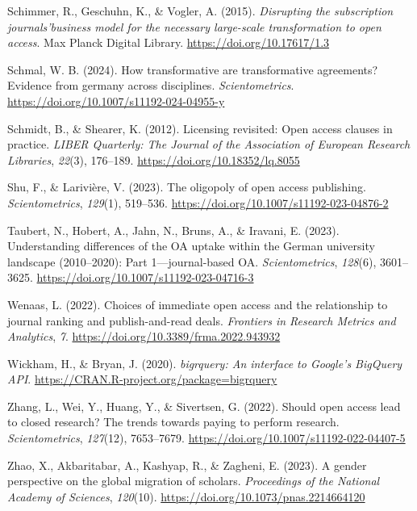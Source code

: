 \documentclass[a4paper,man,floatsintext,longtable,noextraspace,12pt]{apa6}
\newenvironment{CSLReferences}%
  {}%
  {\par}
\begin{document}
\begin{CSLReferences}{1}{0}
\leavevmode{}%
Schimmer, R., Geschuhn, K., \& Vogler, A. (2015). \emph{{Disrupting the
subscription journals'business model for the necessary large-scale
transformation to open access}}. Max Planck Digital Library.
\url{https://doi.org/10.17617/1.3}

\leavevmode{}%
Schmal, W. B. (2024). How transformative are transformative agreements?
Evidence from germany across disciplines. \emph{Scientometrics}.
\url{https://doi.org/10.1007/s11192-024-04955-y}

\leavevmode{}%
Schmidt, B., \& Shearer, K. (2012). Licensing revisited: Open access
clauses in practice. \emph{LIBER Quarterly: The Journal of the
Association of European Research Libraries}, \emph{22}(3), 176--189.
\url{https://doi.org/10.18352/lq.8055}

\leavevmode{}%
Shu, F., \& Larivière, V. (2023). The oligopoly of open access
publishing. \emph{Scientometrics}, \emph{129}(1), 519--536.
\url{https://doi.org/10.1007/s11192-023-04876-2}

\leavevmode{}%
Taubert, N., Hobert, A., Jahn, N., Bruns, A., \& Iravani, E. (2023).
Understanding differences of the OA uptake within the {German}
university landscape (2010--2020): Part 1---journal-based OA.
\emph{Scientometrics}, \emph{128}(6), 3601--3625.
\url{https://doi.org/10.1007/s11192-023-04716-3}

\leavevmode{}%
Wenaas, L. (2022). Choices of immediate open access and the relationship
to journal ranking and publish-and-read deals. \emph{Frontiers in
Research Metrics and Analytics}, \emph{7}.
\url{https://doi.org/10.3389/frma.2022.943932}

\leavevmode{}%
Wickham, H., \& Bryan, J. (2020). \emph{{bigrquery}: An interface to
{Google's BigQuery API}}.
\url{https://CRAN.R-project.org/package=bigrquery}

\leavevmode{}%
Zhang, L., Wei, Y., Huang, Y., \& Sivertsen, G. (2022). Should open
access lead to closed research? The trends towards paying to perform
research. \emph{Scientometrics}, \emph{127}(12), 7653--7679.
\url{https://doi.org/10.1007/s11192-022-04407-5}

\leavevmode{}%
Zhao, X., Akbaritabar, A., Kashyap, R., \& Zagheni, E. (2023). A gender
perspective on the global migration of scholars. \emph{Proceedings of
the National Academy of Sciences}, \emph{120}(10).
\url{https://doi.org/10.1073/pnas.2214664120}

\end{CSLReferences}
\end{document}
